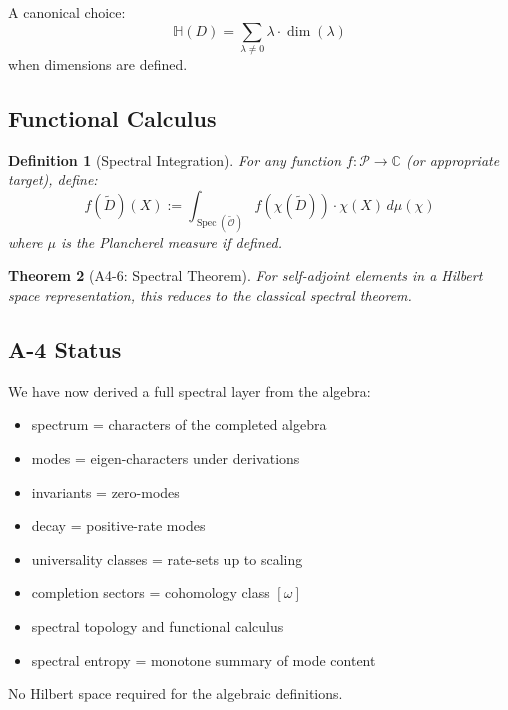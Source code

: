 \documentclass[12pt, oneside]{article}
\newtheorem{theorem}{Theorem}[section]
\newtheorem{definition}[theorem]{Definition}
\DeclareMathOperator{\Spec}{Spec}
\newcommand{\Opr}{\mathcal{O}}
\newcommand{\wtilde}{\widetilde}
\begin{document}
A canonical choice:
\begin{equation}
\mathbb{H}(D) = \sum_{\lambda \neq 0} \lambda \cdot \dim(\lambda)
\end{equation}
when dimensions are defined.

\subsection{Functional Calculus}

\begin{definition}[Spectral Integration]
For any function $f: \mathcal{P} \rightarrow \mathbb{C}$ (or appropriate target), define:
\begin{equation}
f(\wtilde{D})(X) := \int_{\Spec(\wtilde{\Opr})} f(\chi(\wtilde{D})) \cdot \chi(X) \, d\mu(\chi)
\end{equation}
where $\mu$ is the Plancherel measure if defined.
\end{definition}

\begin{theorem}[A4-6: Spectral Theorem]
For self-adjoint elements in a Hilbert space representation, this reduces to the classical spectral theorem.
\end{theorem}

\subsection{A-4 Status}

We have now derived a full spectral layer from the algebra:
\begin{itemize}
    \item spectrum = characters of the completed algebra
    \item modes = eigen-characters under derivations
    \item invariants = zero-modes
    \item decay = positive-rate modes
    \item universality classes = rate-sets up to scaling
    \item completion sectors = cohomology class $[\omega]$
    \item spectral topology and functional calculus
    \item spectral entropy = monotone summary of mode content
\end{itemize}

No Hilbert space required for the algebraic definitions.

\newpage
\end{document}

